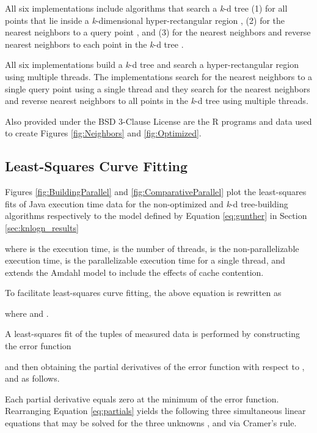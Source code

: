 \documentclass{sig-alternate}
\begin{document}
All six implementations include algorithms that search a \emph{k}-d tree (1) for all points that lie inside a \emph{k}-dimensional hyper-rectangular region \cite{Bentley}, (2) for the nearest neighbors to a query point \cite{Friedman}, and (3) for the nearest neighbors and reverse nearest neighbors to each point in the \emph{k}-d tree \cite{Korn}.

All six implementations build a \emph{k}-d tree and search a hyper-rectangular region using multiple threads. The implementations search for the nearest neighbors to a single query point using a single thread and they search for the nearest neighbors and reverse nearest neighbors to all points in the \emph{k}-d tree using multiple threads.

Also provided under the BSD 3-Clause License are the R programs and data used to create Figures \ref{fig:Neighbors} and \ref{fig:Optimized}.

\newpage

\subsection{Least-Squares Curve Fitting}
\label{sec:least_squares}

Figures \ref{fig:BuildingParallel} and \ref{fig:ComparativeParallel} plot the least-squares fits of Java execution time data for the non-optimized  and  \emph{k}-d tree-building algorithms respectively to the model defined by Equation \ref{eq:gunther} in Section \ref{sec:knlogn_results}

where  is the execution time,  is the number of threads,  is the non-parallelizable execution time,  is the parallelizable execution time for a single thread, and  extends the Amdahl model to include the effects of cache contention.

To facilitate least-squares curve fitting, the above equation is rewritten as

where  and .

A least-squares fit \cite{Thomas} of the  tuples of measured data is performed by constructing the error function

and then obtaining the partial derivatives of the error function with respect to ,  and  as follows.


Each partial derivative equals zero at the minimum of the error function. Rearranging Equation \ref{eq:partials} yields the following three simultaneous linear equations that may be solved for the three unknowns ,  and  via Cramer's rule.
\end{document}
